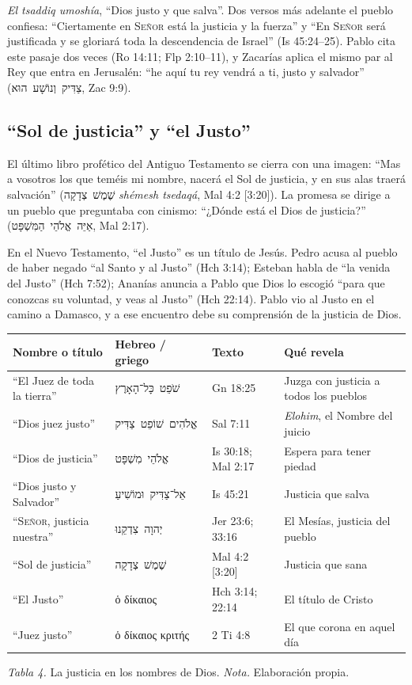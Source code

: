 \documentclass[11pt,letterpaper]{article}
\newcommand{\heb}[1]{\mbox{\foreignlanguage{hebrew}{#1}}}
\newcommand{\grc}[1]{\foreignlanguage{ancientgreek}{#1}}
\newcommand{\SENOR}{\textsc{Señor}}
\begin{document}
\emph{El tsaddiq umoshía}, ``Dios justo y que salva''. Dos versos más adelante el pueblo confiesa: ``Ciertamente en \SENOR{} está la justicia y la fuerza'' y ``En \SENOR{} será justificada y se gloriará toda la descendencia de Israel'' (Is 45:24--25). Pablo cita este pasaje dos veces (Ro 14:11; Flp 2:10--11), y Zacarías aplica el mismo par al Rey que entra en Jerusalén: ``he aquí tu rey vendrá a ti, justo y salvador'' (\heb{צַדִּיק וְנוֹשָׁע הוּא}, Zac 9:9).

\subsection{``Sol de justicia'' y ``el Justo''}
El último libro profético del Antiguo Testamento se cierra con una imagen: ``Mas a vosotros los que teméis mi nombre, nacerá el Sol de justicia, y en sus alas traerá salvación'' (\heb{שֶׁמֶשׁ צְדָקָה} \emph{shémesh tsedaqá}, Mal 4:2 [3:20]). La promesa se dirige a un pueblo que preguntaba con cinismo: ``¿Dónde está el Dios de justicia?'' (\heb{אַיֵּה אֱלֹהֵי הַמִּשְׁפָּט}, Mal 2:17).

En el Nuevo Testamento, ``el Justo'' es un título de Jesús. Pedro acusa al pueblo de haber negado ``al Santo y al Justo'' (Hch 3:14); Esteban habla de ``la venida del Justo'' (Hch 7:52); Ananías anuncia a Pablo que Dios lo escogió ``para que conozcas su voluntad, y veas al Justo'' (Hch 22:14). Pablo vio al Justo en el camino a Damasco, y a ese encuentro debe su comprensión de la justicia de Dios.

\begin{center}
\small\renewcommand{\arraystretch}{1.2}
\begin{tabular}{@{}L{3.9cm}L{3.6cm}L{2.6cm}L{5.0cm}@{}}
\toprule
\textbf{Nombre o título} & \textbf{Hebreo / griego} & \textbf{Texto} & \textbf{Qué revela} \\ \midrule
``El Juez de toda la tierra'' & \heb{שֹׁפֵט כָּל־הָאָרֶץ} & Gn 18:25 & Juzga con justicia a todos los pueblos \\
``Dios juez justo'' & \heb{אֱלֹהִים שׁוֹפֵט צַדִּיק} & Sal 7:11 & \emph{Elohim}, el Nombre del juicio \\
``Dios de justicia'' & \heb{אֱלֹהֵי מִשְׁפָּט} & Is 30:18; Mal 2:17 & Espera para tener piedad \\
``Dios justo y Salvador'' & \heb{אֵל־צַדִּיק וּמוֹשִׁיעַ} & Is 45:21 & Justicia que salva \\
``\SENOR, justicia nuestra'' & \heb{יְהוָה צִדְקֵנוּ} & Jer 23:6; 33:16 & El Mesías, justicia del pueblo \\
``Sol de justicia'' & \heb{שֶׁמֶשׁ צְדָקָה} & Mal 4:2 [3:20] & Justicia que sana \\
``El Justo'' & \grc{ὁ δίκαιος} & Hch 3:14; 22:14 & El título de Cristo \\
``Juez justo'' & \grc{ὁ δίκαιος κριτής} & 2 Ti 4:8 & El que corona en aquel día \\ \bottomrule
\end{tabular}\par\smallskip
{\footnotesize\color{gris}\textit{Tabla 4.} La justicia en los nombres de Dios. \textit{Nota.} Elaboración propia.}
\end{center}
\end{document}
